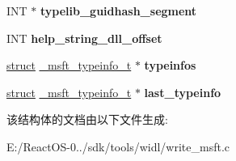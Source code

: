 \begin{DoxyCompactItemize}
\item 
\mbox{\label{struct__msft__typelib__t_a1d88f98f10629c4b57f1938b86ec5090}} 
I\+NT $\ast$ {\bfseries typelib\+\_\+guidhash\+\_\+segment}
\item 
\mbox{\label{struct__msft__typelib__t_a75a768a52f957b711d5b3b57495f2e36}} 
I\+NT {\bfseries help\+\_\+string\+\_\+dll\+\_\+offset}
\item 
\mbox{\label{struct__msft__typelib__t_a29d087aa13a1049382665b73b2b3b9c6}} 
\hyperlink{interfacestruct}{struct} \hyperlink{struct__msft__typeinfo__t}{\+\_\+msft\+\_\+typeinfo\+\_\+t} $\ast$ {\bfseries typeinfos}
\item 
\mbox{\label{struct__msft__typelib__t_afabbe2b37108ed086837455e2db30287}} 
\hyperlink{interfacestruct}{struct} \hyperlink{struct__msft__typeinfo__t}{\+\_\+msft\+\_\+typeinfo\+\_\+t} $\ast$ {\bfseries last\+\_\+typeinfo}
\end{DoxyCompactItemize}


该结构体的文档由以下文件生成\+:\begin{DoxyCompactItemize}
\item 
E\+:/\+React\+O\+S-\/0../sdk/tools/widl/write\+\_\+msft.\+c\end{DoxyCompactItemize}
